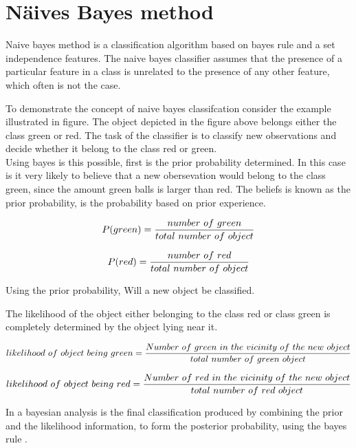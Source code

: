 \documentclass[10pt,a4paper]{article}
\begin{document}
\section{Näives Bayes method}
Naive bayes method is a classification algorithm based on bayes rule and a set independence features. The naive bayes classifier assumes that the presence of a particular feature in a class is unrelated to the presence of any other feature, which often is not the case. 


To demonstrate the concept of naive bayes classifcation consider the example illustrated in figure. 
The object depicted in the figure above belongs either the class green or red.  The task of the classifier is to classify new  observations and decide whether it belong to the class red or green. \\

Using bayes is this possible, first is the prior probability determined. In this case is it very likely to believe that a new obersevation would belong to the class green, since the amount green balls is larger than red.  The beliefs is known as the prior probability, is the probability based on prior experience. 

\begin{equation}
\centering
P(green) = \frac{number~of~green}{total~number~of~object}
\end{equation}

\begin{equation}
\centering
P(red) = \frac{number~of~red}{total~number~of~object}
\end{equation}

Using the prior probability, Will  a new object be classified. 


The likelihood of the object either belonging to the class red or class green is completely determined by the object lying near it. 

\begin{equation}
\centering
likelihood~of~object~being~green = \frac{Number~of~green~in~the~vicinity~of~the~new~object }{total~number~of~green~object}
\end{equation}

\begin{equation}
\centering
likelihood~of~object~being~red = \frac{Number~of~red~in~the~vicinity~of~the~new~object }{total~number~of~red~object}
\end{equation}




In a bayesian analysis is the final classification produced by combining the prior and the likelihood information, to form the posterior probability, using the bayes rule . 



 
\end{document}
